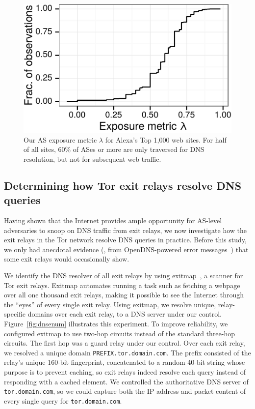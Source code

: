 \begin{figure}[t]
	\centering
	\includegraphics[width=0.65\linewidth]{figures/dns-exposure.pdf}
	\caption{Our AS exposure metric $\lambda$ for Alexa's Top 1,000 web sites.
	For half of all sites, 60\% of ASes or more are only traversed for DNS
	resolution, but not for subsequent web traffic.}
	\label{fig:exposure}
\end{figure}

\subsection{Determining how Tor exit relays resolve DNS queries}
\label{sec:mapping-resolvers}

Having shown that the Internet provides ample opportunity for
AS-level adversaries to snoop on DNS traffic from exit relays, we
now investigate how the exit relays in the Tor network resolve DNS
queries in practice. Before this study,
we only had anecdotal evidence (\eg, from OpenDNS-powered error
messages~\cite[\S~4.1]{Winter2014b}) that some exit relays would occasionally
show.

We identify the DNS resolver of all exit relays by using
exitmap~\cite{exitmap}, a scanner for Tor exit relays.  Exitmap automates
running a task such as fetching a webpage over all one thousand exit relays,
making it possible to see the Internet through the ``eyes'' of every single
exit relay.  Using exitmap, we resolve unique, relay-specific domains over
each exit relay, to a DNS server under our control.
Figure~\ref{fig:dnsenum} illustrates this experiment.  To improve reliability, we configured
exitmap to use two-hop circuits instead of the standard three-hop circuits.
The first hop was a guard relay under our control.  Over each exit relay, we
resolved a unique domain {\tt PREFIX.tor.domain.com}.  The prefix consisted of the
relay's unique 160-bit fingerprint, concatenated to a random 40-bit string
whose purpose is to prevent caching, so exit relays indeed resolve each query
instead of responding with a cached element.  We controlled the authoritative
DNS server of {\tt tor.domain.com}, so we could capture both the IP address and packet
content of every single query for {\tt tor.domain.com}.

